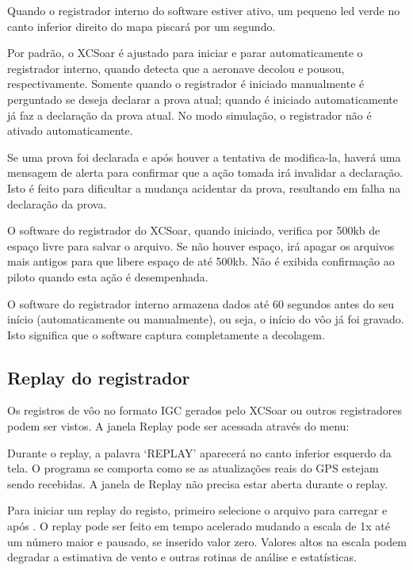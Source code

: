 Quando o registrador interno do software estiver ativo, um pequeno led verde no canto inferior direito do mapa piscará por um segundo.

Por padrão, o XCSoar é ajustado para iniciar e parar automaticamente o registrador interno, quando detecta que a aeronave decolou e pousou, respectivamente.  Somente quando o registrador é iniciado manualmente é perguntado se deseja declarar a prova atual; quando é iniciado automaticamente já faz a declaração da prova atual.  No modo simulação, o registrador não é ativado automaticamente.

Se uma prova foi declarada e após houver a tentativa de modifica-la, haverá uma mensagem de alerta para confirmar que a ação tomada irá invalidar a declaração.  Isto é feito para dificultar a mudança acidentar da prova, resultando em falha na declaração da prova.

O software do registrador do XCSoar, quando iniciado, verifica por 500kb de espaço livre para salvar o arquivo.  Se não houver espaço, irá apagar os arquivos mais antigos para que libere espaço de até 500kb.  Não é exibida confirmação ao piloto quando esta ação é desempenhada. \warning

O software do registrador interno armazena dados até 60 segundos antes do seu início (automaticamente ou manualmente), ou seja, o início do vôo já foi gravado.  Isto significa que o software captura completamente a decolagem.

\subsection*{Replay do registrador}\label{sec:logger-replay}
Os registros de vôo no formato IGC gerados pelo XCSoar ou outros registradores podem ser vistos.  A janela Replay pode ser acessada através do menu:
\begin{quote}
\blink{}
\end{quote}

Durante o replay, a palavra ‘REPLAY’ aparecerá no canto inferior esquerdo da tela.  O programa se comporta como se as atualizações reais do GPS estejam sendo recebidas.  A janela de Replay não precisa estar aberta durante o replay.

Para iniciar um replay do registo, primeiro selecione o arquivo para carregar e após 
.  O replay pode ser feito em tempo acelerado mudando a escala de 1x até um número maior e pausado, se inserido valor zero.  Valores altos na escala podem degradar a estimativa de vento e outras rotinas de análise e estatísticas.

